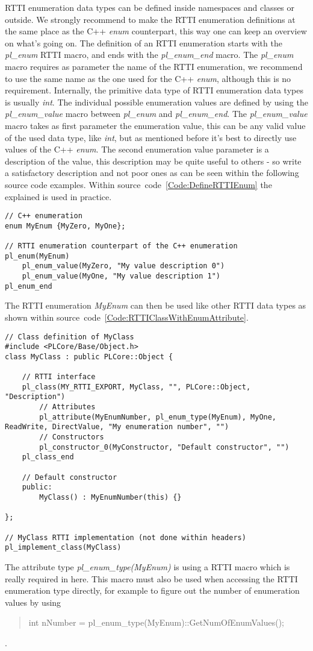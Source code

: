 RTTI enumeration data types can be defined inside namespaces and classes or outside. We strongly recommend to make the RTTI enumeration definitions at the same place as the C++ \emph{enum} counterpart, this way one can keep an overview on what's going on. The definition of an RTTI enumeration starts with the \emph{pl\_enum} RTTI macro, and ends with the \emph{pl\_enum\_end} macro. The \emph{pl\_enum} macro requires as parameter the name of the RTTI enumeration, we recommend to use the same name as the one used for the C++ \emph{enum}, although this is no requirement. Internally, the primitive data type of RTTI enumeration data types is usually \emph{int}. The individual possible enumeration values are defined by using the \emph{pl\_enum\_value} macro between \emph{pl\_enum} and \emph{pl\_enum\_end}. The \emph{pl\_enum\_value} macro takes as first parameter the enumeration value, this can be any valid value of the used data type, like \emph{int}, but as mentioned before it's best to directly use values of the C++ \emph{enum}. The second enumeration value parameter is a description of the value, this description may be quite useful to others - so write a satisfactory description and not poor ones as can be seen within the following source code examples. Within source~code~\ref{Code:DefineRTTIEnum} the explained is used in practice.
\begin{lstlisting}[float=htb,label=Code:DefineRTTIEnum,caption={Defining a new RTTI enumeration}]
// C++ enumeration
enum MyEnum {MyZero, MyOne};

// RTTI enumeration counterpart of the C++ enumeration
pl_enum(MyEnum)
	pl_enum_value(MyZero, "My value description 0")
	pl_enum_value(MyOne, "My value description 1")
pl_enum_end
\end{lstlisting}
The RTTI enumeration \emph{MyEnum} can then be used like other RTTI data types as shown within source~code~\ref{Code:RTTIClassWithEnumAttribute}.
\begin{lstlisting}[label=Code:RTTIClassWithEnumAttribute,caption={Defining a new RTTI class with an enumeration attribute}]
// Class definition of MyClass
#include <PLCore/Base/Object.h>
class MyClass : public PLCore::Object {

	// RTTI interface
	pl_class(MY_RTTI_EXPORT, MyClass, "", PLCore::Object, "Description")
		// Attributes
		pl_attribute(MyEnumNumber, pl_enum_type(MyEnum), MyOne, ReadWrite, DirectValue, "My enumeration number", "")
		// Constructors
		pl_constructor_0(MyConstructor, "Default constructor", "")
	pl_class_end

	// Default constructor
	public:
		MyClass() : MyEnumNumber(this) {}

};

// MyClass RTTI implementation (not done within headers)
pl_implement_class(MyClass)
\end{lstlisting}
The attribute type \emph{pl\_enum\_type(MyEnum)} is using a RTTI macro which is really required in here. This macro must also be used when accessing the RTTI enumeration type directly, for example to figure out the number of enumeration values by using \begin{quote}int nNumber = pl\_enum\_type(MyEnum)::GetNumOfEnumValues();\end{quote}.

